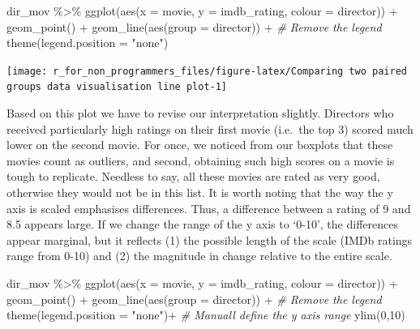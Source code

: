\documentclass[
]{book}
\newenvironment{Shaded}{\begin{snugshade}}{\end{snugshade}}
\newcommand{\AttributeTok}[1]{\textcolor[rgb]{0.77,0.63,0.00}{#1}}
\newcommand{\CommentTok}[1]{\textcolor[rgb]{0.56,0.35,0.01}{\textit{#1}}}
\newcommand{\DecValTok}[1]{\textcolor[rgb]{0.00,0.00,0.81}{#1}}
\newcommand{\FunctionTok}[1]{\textcolor[rgb]{0.00,0.00,0.00}{#1}}
\newcommand{\NormalTok}[1]{#1}
\newcommand{\SpecialCharTok}[1]{\textcolor[rgb]{0.00,0.00,0.00}{#1}}
\newcommand{\StringTok}[1]{\textcolor[rgb]{0.31,0.60,0.02}{#1}}
\begin{document}
\begin{Shaded}
\begin{Highlighting}[]
\NormalTok{dir\_mov }\SpecialCharTok{\%\textgreater{}\%}
  \FunctionTok{ggplot}\NormalTok{(}\FunctionTok{aes}\NormalTok{(}\AttributeTok{x =}\NormalTok{ movie, }\AttributeTok{y =}\NormalTok{ imdb\_rating, }\AttributeTok{colour =}\NormalTok{ director)) }\SpecialCharTok{+}
  \FunctionTok{geom\_point}\NormalTok{() }\SpecialCharTok{+}
  \FunctionTok{geom\_line}\NormalTok{(}\FunctionTok{aes}\NormalTok{(}\AttributeTok{group =}\NormalTok{ director)) }\SpecialCharTok{+}
  \CommentTok{\# Remove the legend}
  \FunctionTok{theme}\NormalTok{(}\AttributeTok{legend.position =} \StringTok{"none"}\NormalTok{)}
\end{Highlighting}
\end{Shaded}

\begin{center}\texttt{[image: r\_for\_non\_programmers\_files/figure-latex/Comparing two paired groups data visualisation line plot-1]} \end{center}

Based on this plot we have to revise our interpretation slightly. Directors who received particularly high ratings on their first movie (i.e.~the top 3) scored much lower on the second movie. For once, we noticed from our boxplots that these movies count as outliers, and second, obtaining such high scores on a movie is tough to replicate. Needless to say, all these movies are rated as very good, otherwise they would not be in this list. It is worth noting that the way the y axis is scaled emphasises differences. Thus, a difference between a rating of 9 and 8.5 appears large. If we change the range of the y axis to `0-10', the differences appear marginal, but it reflects (1) the possible length of the scale (IMDb ratings range from 0-10) and (2) the magnitude in change relative to the entire scale.

\begin{Shaded}
\begin{Highlighting}[]
\NormalTok{dir\_mov }\SpecialCharTok{\%\textgreater{}\%}
  \FunctionTok{ggplot}\NormalTok{(}\FunctionTok{aes}\NormalTok{(}\AttributeTok{x =}\NormalTok{ movie, }\AttributeTok{y =}\NormalTok{ imdb\_rating, }\AttributeTok{colour =}\NormalTok{ director)) }\SpecialCharTok{+}
  \FunctionTok{geom\_point}\NormalTok{() }\SpecialCharTok{+}
  \FunctionTok{geom\_line}\NormalTok{(}\FunctionTok{aes}\NormalTok{(}\AttributeTok{group =}\NormalTok{ director)) }\SpecialCharTok{+}
  \CommentTok{\# Remove the legend}
  \FunctionTok{theme}\NormalTok{(}\AttributeTok{legend.position =} \StringTok{"none"}\NormalTok{)}\SpecialCharTok{+}
  \CommentTok{\# Manuall define the y axis range}
  \FunctionTok{ylim}\NormalTok{(}\DecValTok{0}\NormalTok{,}\DecValTok{10}\NormalTok{)}
\end{Highlighting}
\end{Shaded}
\end{document}
